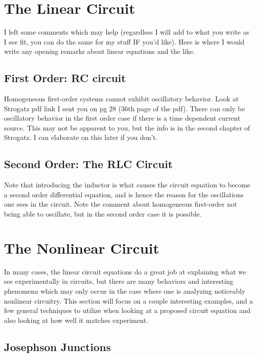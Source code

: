 \documentclass[12pt]{article}
\begin{document}
\section{The Linear Circuit}

I left some comments which may help (regardless I will add to what you write as I see fit, you can do the same for my stuff IF you'd like).  Here is where I would write any opening remarks about linear equations and the like.

\subsection{First Order: RC circuit}

Homogeneous first-order systems cannot exhibit oscillatory behavior. Look at Strogatz pdf link I sent you on pg 28 (36th page of the pdf).  There can only be oscillatory behavior in the first order case if there is a time dependent current source.  This may not be apparent to you, but the info is in the second chapter of Strogatz.  I can elaborate on this later if you don't.

\subsection{Second Order: The RLC Circuit}

Note that introducing the inductor is what causes the circuit equation to become a second order differential equation, and is hence the reason for the oscillations one sees in the circuit.  Note the comment about homogeneous first-order not being able to oscillate, but in the second order case it is possible.


\section{The Nonlinear Circuit}

In many cases, the linear circuit equations do a great job at explaining what we see experimentally in circuits, but there are many behaviors and interesting phenomena which may only occur in the case where one is analyzing noticeably nonlinear circuitry.  This section will focus on a couple interesting examples, and a few general techniques to utilize when looking at a proposed circuit equation and also looking at how well it matches experiment.

\subsection{Josephson Junctions}
\end{document}
